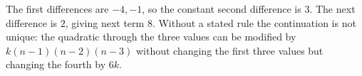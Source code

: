 The first differences are $-4,-1$, so the constant second difference is $3$. The next difference is $2$, giving next term $\boxed8$. Without a stated rule the continuation is not unique: the quadratic through the three values can be modified by $k(n-1)(n-2)(n-3)$ without changing the first three values but changing the fourth by $6k$.
